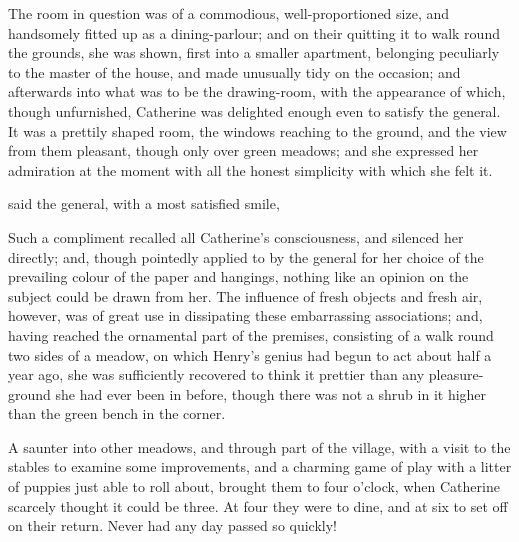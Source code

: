 The room in question was of a commodious, well-proportioned size, and handsomely fitted up as a dining-parlour; and on their quitting it to walk round the grounds, she was shown, first into a smaller apartment, belonging peculiarly to the master of the house, and made unusually tidy on the occasion; and afterwards into what was to be the drawing-room, with the appearance of which, though unfurnished, Catherine was delighted enough even to satisfy the general. It was a prettily shaped room, the windows reaching to the ground, and the view from them pleasant, though only over green meadows; and she expressed her admiration at the moment with all the honest simplicity with which she felt it. 

 said the general, with a most satisfied smile, 



Such a compliment recalled all Catherine's consciousness, and silenced her directly; and, though pointedly applied to by the general for her choice of the prevailing colour of the paper and hangings, nothing like an opinion on the subject could be drawn from her. The influence of fresh objects and fresh air, however, was of great use in dissipating these embarrassing associations; and, having reached the ornamental part of the premises, consisting of a walk round two sides of a meadow, on which Henry's genius had begun to act about half a year ago, she was sufficiently recovered to think it prettier than any pleasure-ground she had ever been in before, though there was not a shrub in it higher than the green bench in the corner.

A saunter into other meadows, and through part of the village, with a visit to the stables to examine some improvements, and a charming game of play with a litter of puppies just able to roll about, brought them to four o'clock, when Catherine scarcely thought it could be three. At four they were to dine, and at six to set off on their return. Never had any day passed so quickly!

